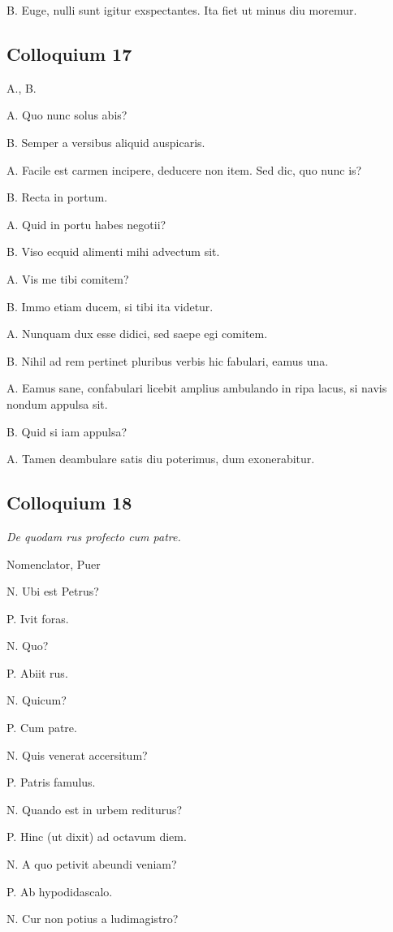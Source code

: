 \documentclass{article}
\begin{document}
B. Euge, nulli sunt igitur exspectantes. Ita fiet ut minus diu moremur.

\subsection{Colloquium 17}
A., B.

A. Quo nunc solus abis?

B. Semper a versibus aliquid auspicaris.

A. Facile est carmen incipere, deducere non item. Sed dic, quo nunc is?

B. Recta in portum. 

A. Quid in portu habes negotii?

B. Viso ecquid alimenti mihi advectum sit. 

A. Vis me tibi comitem?

B. Immo etiam ducem, si tibi ita videtur. 

A. Nunquam dux esse didici, sed saepe egi comitem. 

B. Nihil ad rem pertinet pluribus verbis hic fabulari, eamus una. 

A. Eamus sane, confabulari licebit amplius ambulando in ripa lacus, si navis nondum appulsa sit. 

B. Quid si iam appulsa?

A. Tamen deambulare satis diu poterimus, dum exonerabitur. 

\subsection{Colloquium 18}
\emph{De quodam rus profecto cum patre.}

Nomenclator, Puer

N. Ubi est Petrus?

P. Ivit foras. 

N. Quo?

P. Abiit rus. 

N. Quicum?

P. Cum patre. 

N. Quis venerat accersitum?

P. Patris famulus. 

N. Quando est in urbem rediturus?

P. Hinc (ut dixit) ad octavum diem.

 
N. A quo petivit abeundi veniam?

P. Ab hypodidascalo. 

N. Cur non potius a ludimagistro?
\end{document}
